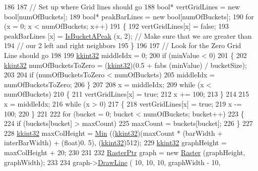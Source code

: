 \begin{DoxyCode}
186 
187   \textcolor{comment}{// Set up where Grid lines should go}
188   \textcolor{keywordtype}{bool}*  vertGridLines = \textcolor{keyword}{new} \textcolor{keywordtype}{bool}[numOfBuckets];
189   \textcolor{keywordtype}{bool}*  peakBarLines  = \textcolor{keyword}{new} \textcolor{keywordtype}{bool}[numOfBuckets];
190   \textcolor{keywordflow}{for}  (x = 0;  x < numOfBuckets;  x++)
191   \{
192     vertGridLines[x] = \textcolor{keyword}{false};
193     peakBarLines [x] = \hyperlink{class_k_k_b_1_1_histogram_afdb9c9d0c533d0f960755ef34e625d52}{IsBucketAPeak} (x, 2);  \textcolor{comment}{// Make sure that we are greater than }
194                                               \textcolor{comment}{// our 2 left and right neighbors}
195   \}
196 
197   \textcolor{comment}{// Look for the Zero Grid Line should go}
198 
199   \hyperlink{namespace_k_k_b_a8fa4952cc84fda1de4bec1fbdd8d5b1b}{kkint32}  middleIdx = 0;
200   \textcolor{keywordflow}{if}  (minValue < 0)
201   \{
202     \hyperlink{namespace_k_k_b_a8fa4952cc84fda1de4bec1fbdd8d5b1b}{kkint32}  numOfBucketsToZero = (\hyperlink{namespace_k_k_b_a8fa4952cc84fda1de4bec1fbdd8d5b1b}{kkint32})(0.5 + fabs (minValue) / bucketSize);
203 
204     \textcolor{keywordflow}{if}  (numOfBucketsToZero < numOfBuckets)
205       middleIdx = numOfBucketsToZero;
206   \}
207 
208   x = middleIdx;
209   \textcolor{keywordflow}{while}  (x < numOfBuckets)
210   \{
211     vertGridLines[x] = \textcolor{keyword}{true};
212     x += 100;
213   \}
214 
215   x = middleIdx;
216   \textcolor{keywordflow}{while}  (x > 0)
217   \{
218     vertGridLines[x] = \textcolor{keyword}{true};
219     x -= 100;
220   \}
221 
222   \textcolor{keywordflow}{for}  (bucket = 0;  bucket < numOfBuckets;  bucket++)
223   \{
224     \textcolor{keywordflow}{if}  (buckets[bucket] > maxCount)
225       maxCount = buckets[bucket];
226   \}
227 
228   \hyperlink{namespace_k_k_b_a8fa4952cc84fda1de4bec1fbdd8d5b1b}{kkint32}  maxColHeight = \hyperlink{namespace_k_k_b_ad030d1ca8bd5038824c4a923a4d23fb5}{Min} ((\hyperlink{namespace_k_k_b_a8fa4952cc84fda1de4bec1fbdd8d5b1b}{kkint32})(maxCount * (barWidth + interBarWidth) + (\textcolor{keywordtype}{float})0.
      5), (\hyperlink{namespace_k_k_b_a8fa4952cc84fda1de4bec1fbdd8d5b1b}{kkint32})512);
229   \hyperlink{namespace_k_k_b_a8fa4952cc84fda1de4bec1fbdd8d5b1b}{kkint32}  graphHeight = maxColHeight + 20;
230 
231 
232   \hyperlink{class_k_k_b_1_1_raster}{RasterPtr}  graph = \textcolor{keyword}{new} \hyperlink{class_k_k_b_1_1_raster}{Raster} (graphHeight, graphWidth);
233 
234   graph->\hyperlink{class_k_k_b_1_1_raster_a118bf0fa32356ddea42f579c044c65cd}{DrawLine} (              10,              10,               10, graphWidth - 10, 

\end{DoxyCode}
